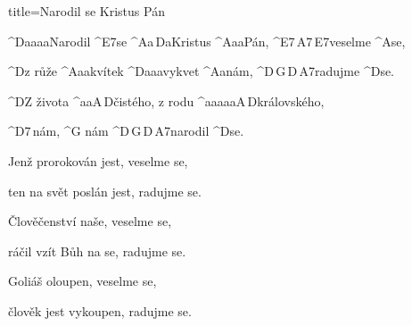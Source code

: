 \begin{song}{title=\predtitle\centering Narodil se Kristus Pán \\\large   \vspace*{-0.3cm}}  %
\begin{centerjustified}
\nejnejvetsi

\sloka
	^{D{\color{white}aaaa}}Narodil ^{E7}se ^{A{\color{white}a}\,D{\color{white}a}}Kristus ^{A{\color{white}aa}}Pán, ^{E7\,A7\,E7}veselme ^{A}se,

	^{D}z růže ^{A{\color{white}aa}}kvítek ^{D{\color{white}aaa}}vykvet ^{A{\color{white}a}}nám, ^{D\,G\,D\,A7}radujme ^{D}se.

	^{D}Z života ^{{\color{white}aa}A\,D}čistého, z rodu ^{{\color{white}aaaaa}A\,D}královského,

	^{D7\,}nám, ^{G\,\,}nám ^{D\,G\,D\,A7}narodil ^{D}se.

\sloka
	Jenž prorokován jest, veselme se,

	ten na svět poslán jest, radujme se.


\sloka
	Člověčenství naše, veselme se,

	ráčil vzít Bůh na se, radujme se.



\sloka
	Goliáš oloupen, veselme se,

	člověk jest vykoupen, radujme se.




\end{centerjustified}
\setcounter{Slokočet}{0}
\end{song}
